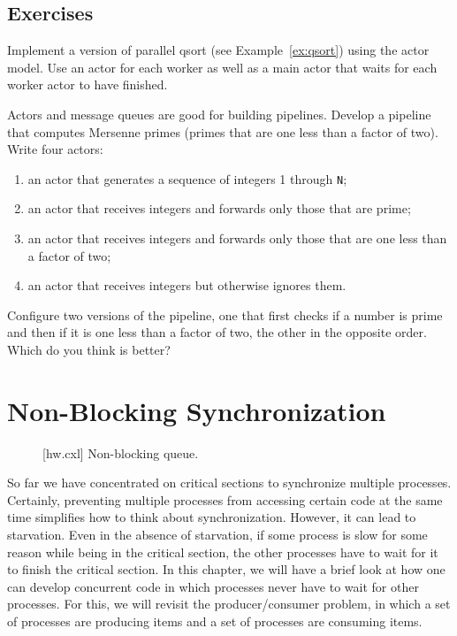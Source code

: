 \documentclass{report}
\newenvironment{code}{
\tcolorbox
}{
\endtcolorbox
}
\begin{document}
\section*{Exercises}
\begin{problems}
\item Implement a version of parallel qsort (see Example~\ref{ex:qsort})
using the actor model.  Use an actor for each worker as well as a main
actor that waits for each worker actor to have finished.
\item Actors and message queues are good for building pipelines.
Develop a pipeline that computes Mersenne primes (primes that are one less
than a factor of two).  Write four actors:
\begin{enumerate}
\item an actor that generates a sequence of integers 1 through \texttt{N};
\item an actor that receives integers and forwards only those that are prime;
\item an actor that receives integers and forwards only those that are one
less than a factor of two;
\item an actor that receives integers but otherwise ignores them.
\end{enumerate}
Configure two versions of the pipeline, one that first checks if a number
is prime and then if it is one less than a factor of two, the other
in the opposite order.  Which do you think is better?
\end{problems}

\chapter{Non-Blocking Synchronization}
\label{ch:nonblocking}

\begin{figure}
\begin{code}
\end{code}
\caption{[hw.cxl] Non-blocking queue.}
\label{fig:hw}
\end{figure}

So far we have concentrated on critical sections to synchronize multiple
processes.  Certainly, preventing multiple processes from accessing
certain code at the same time simplifies how to think about synchronization.
However, it can lead to starvation.  Even in the absence of starvation,
if some process is slow for some reason while being in the critical section,
the other processes have to wait for it to finish the critical section.
In this chapter, we will have a brief look at how one can develop concurrent
code in which processes never have to wait for other processes.
For this, we will revisit the producer/consumer problem, in which a
set of processes are producing items and a set of processes are
consuming items.
\end{document}
